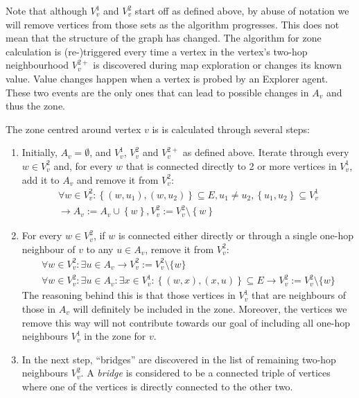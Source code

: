 Note that although $V_v^1$ and $V_v^2$ start off as defined above, by abuse of notation we will remove vertices from those sets as the algorithm progresses.
This does not mean that the structure of the graph has changed.
The algorithm for zone calculation is (re-)triggered every time a vertex in the vertex's two-hop neighbourhood $V_{v}^{2+}$ is discovered during map exploration or changes its known value.
Value changes happen when a vertex is probed by an Explorer agent.
These two events are the only ones that can lead to possible changes in $A_v$ and thus the zone.

The zone centred around vertex $v$ is is calculated through several steps:
\begin{enumerate}
  \item Initially, $A_v = \emptyset$, and $V_v^1$, $V_v^2$ and $V_v^{2+}$ as defined above.
        Iterate through every $w \in V_v^2$ and, for every $w$ that is connected directly to 2 or more vertices in $V_v^1$, add it to $A_v$ and remove it from $V_v^2$:
        \begin{multline}
        \forall w \in V_v^2: \left\{\left(w, u_1 \right ), \left(w, u_2 \right )\right\} \subseteq E, u_1 \neq u_2, \left\{u_1, u_2\right\} \subseteq V_v^1 \\
        \rightarrow A_v := A_v \cup \left\{w\right\}, V_v^2 := V_v^2 \setminus \left\{w \right \}
        \end{multline}
  \item For every $w \in V_v^2$, if $w$ is connected either directly or through a single one-hop neighbour of $v$ to any $u \in A_v$, remove it from $V_v^2$:
  \begin{multline}
  \forall w \in V_v^2: \exists u \in A_v \rightarrow V_v^2 := V_v^2 \setminus \{w\}
\\ \forall w \in V_v^2: \exists u \in A_v: \exists x \in V_v^1: \left\{\left(w, x \right ), \left(x, u \right )\right\} \subseteq E\rightarrow V_v^2 := V_v^2 \setminus \{w\}
  \end{multline}
      The reasoning behind this is that those vertices in $V_v^1$ that are neighbours of those in $A_v$ will definitely be included in the zone.
      Moreover, the vertices we remove this way will not contribute towards our goal of including all one-hop neighbours $V_v^1$ in the zone for $v$.
  \item In the next step, \enquote{bridges} are discovered in the list of remaining two-hop neighbours $V_v^2$.
        A \emph{bridge} is considered to be a connected triple of vertices where one of the vertices is directly connected to the other two.

\end{enumerate}
